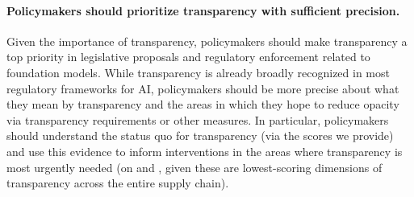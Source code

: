 \paragraph{Policymakers should prioritize transparency with sufficient precision.}
Given the importance of transparency, policymakers should make transparency a top priority in legislative proposals and regulatory enforcement related to foundation models. 
While transparency is already broadly recognized in most regulatory frameworks for AI, policymakers should be more precise about what they mean by transparency and the areas in which they hope to reduce opacity via transparency requirements or other measures.
In particular, policymakers should understand the status quo for transparency (\eg via the scores we provide) and use this evidence to inform interventions in the areas where transparency is most urgently needed (\eg on \labor and \impact, given these are lowest-scoring dimensions of transparency across the entire supply chain). 
\clearpage